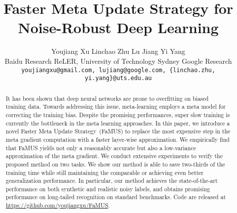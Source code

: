 \documentclass[final]{cvpr}
\newcommand{\methodname}{Faster Meta Update Strategy}
\newcommand{\methodnameabbre}{FaMUS}
\begin{document}
\title{Faster Meta Update Strategy for Noise-Robust Deep Learning}

\author{Youjiang Xu \hspace{12pt} Linchao Zhu \hspace{12pt} Lu Jiang \hspace{12pt}  Yi Yang\\
Baidu Research ReLER, University of Technology Sydney Google Research\\
{\tt\small youjiangxu@gmail.com, lujiang@google.com, \{linchao.zhu, yi.yang\}@uts.edu.au}
}

\maketitle
\thispagestyle{empty} 






\begin{abstract}
It has been shown that deep neural networks are prone to overfitting on biased training data. Towards addressing this issue, meta-learning employs a meta model for correcting the training bias. 
Despite the promising performances, super slow training is currently the bottleneck in the meta learning approaches.
In this paper, we introduce a novel \methodname\ (\methodnameabbre) to replace the most expensive step in the meta gradient computation with a faster layer-wise approximation. We empirically find that \methodnameabbre\xspace yields not only a reasonably accurate but also a low-variance approximation of the meta gradient.
We conduct extensive experiments to verify the proposed method on two tasks. We show our method is able to save two-thirds of the training time while still maintaining the comparable or achieving even better generalization performance. In particular, our method achieves the state-of-the-art performance on
both synthetic and realistic noisy labels, and obtains promising performance on long-tailed recognition on standard benchmarks. Code are released at {\small \url{https://github.com/youjiangxu/FaMUS}}.

\end{abstract} 
\end{document}
